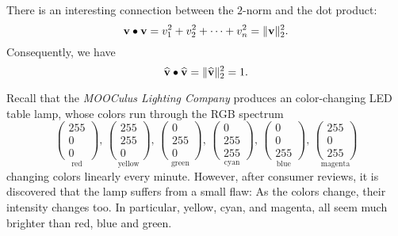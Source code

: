 \documentclass{ximera}
\begin{document}
There is an interesting connection between the $2$-norm and the dot product:
\[
  \mathbf{v} \bullet \mathbf{v} = v_1^2 + v_2^2 + \cdots + v_n^2 = \| \mathbf{v} \|_2^2.
\]
Consequently, we have
\[
  \widehat{\mathbf{v}} \bullet \widehat{\mathbf{v}} = \| \widehat{\mathbf{v}} \|_2^2 = 1.
\]

\begin{example}
  Recall that the \textit{MOOCulus Lighting Company} produces an
  color-changing LED table lamp, whose colors run through the RGB
  spectrum
  \[
    \underset{\text{red}}{\begin{pmatrix}255\\0\\0\end{pmatrix}},\,
    \underset{\text{yellow}}{\begin{pmatrix}255\\255\\0\end{pmatrix}},\,
    \underset{\text{green}}{\begin{pmatrix}0\\255\\0\end{pmatrix}},\,
    \underset{\text{cyan}}{\begin{pmatrix}0\\255\\255\end{pmatrix}},\,
    \underset{\text{blue}}{\begin{pmatrix}0\\0\\255\end{pmatrix}},\,
    \underset{\text{magenta}}{\begin{pmatrix}255\\0\\255\end{pmatrix}}
  \]
  changing colors linearly every minute. However, after consumer
  reviews, it is discovered that the lamp suffers from a small flaw:
  As the colors change, their intensity changes too. In particular,
  yellow, cyan, and magenta, all seem much brighter than red, blue
  and green.
  \begin{center}
\end{center}
\end{example}
\end{document}

